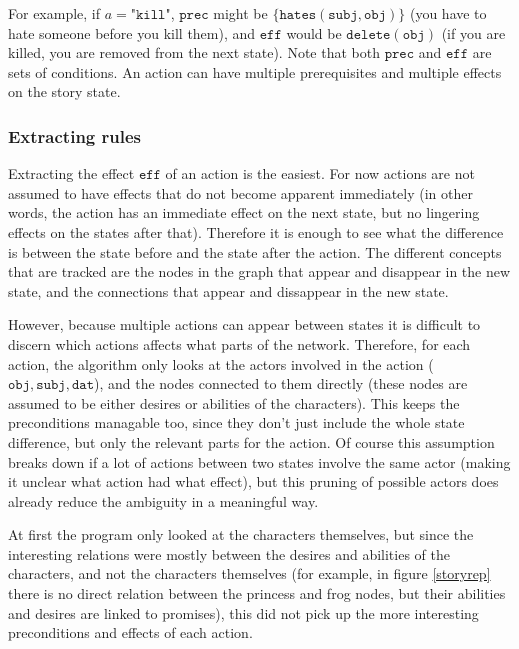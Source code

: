 For example, if $a = \texttt{"kill"}$, $\texttt{prec}$ might be 
$ \{\texttt{hates}(\texttt{subj}, \texttt{obj})\} $ (you have to hate someone 
before you kill them), and $\texttt{eff}$ would be ${\texttt{delete}(\texttt{obj})}$
(if you are killed, you are removed from the next state).
Note that both $\texttt{prec}$ and $\texttt{eff}$ are sets of conditions.
An action can have multiple prerequisites and multiple effects on the story state.

\subsubsection{Extracting rules}

Extracting the effect $\texttt{eff}$ of an action is the easiest. For now
actions are not assumed to have effects that do not become apparent immediately
(in other words, the action has an immediate effect on the next state, but no
lingering effects on the states after that).
Therefore it is enough to see what the difference is between the state before
and the state after the action. The different concepts that are tracked are the
nodes in the graph that appear and disappear in the new state, and the
connections that appear and dissappear in the new state.

However, because multiple actions can appear between states it is difficult to
discern which actions affects what parts of the network. 
Therefore, for each action, the algorithm only looks at the actors involved in 
the action ($\texttt{obj}, \texttt{subj}, \texttt{dat}$), and the nodes
connected to them directly (these nodes are assumed to be either desires or
abilities of the characters). This keeps the preconditions managable too, since
they don't just include the whole state difference, but only the relevant parts
for the action. Of course this assumption breaks down if a lot of actions
between two states
involve the same actor (making it unclear what action had what effect), but this pruning of possible actors does already reduce
the ambiguity in a meaningful way.

At first the program only looked at the characters themselves, but since the
interesting relations were mostly between the desires and abilities of the
characters, and not the characters themselves (for example, in figure
\ref{storyrep} there is no direct relation between the princess and frog nodes,
but their abilities and desires are linked to promises), this did not pick up the more
interesting preconditions and effects of each action.


